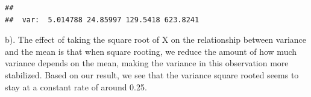 \documentclass[
]{article}
\begin{document}
\begin{verbatim}
## 
##  var:  5.014788 24.85997 129.5418 623.8241
\end{verbatim}

b). The effect of taking the square root of X on the relationship
between variance and the mean is that when square rooting, we reduce the
amount of how much variance depends on the mean, making the variance in
this observation more stabilized. Based on our result, we see that the
variance square rooted seems to stay at a constant rate of around 0.25.
\end{document}
